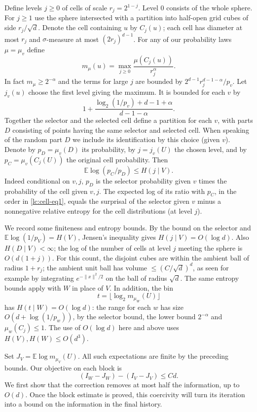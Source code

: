 Define levels \(j\ge 0\) of cells of scale \(r_j=2^{1-j}\). Level 0 consists of the whole sphere. For \(j\ge 1\) use the sphere intersected with a partition into half-open grid cubes of side \(r_j/\sqrt d\). Denote the cell containing \(u\) by \(C_j(u)\); each cell has diameter at most \(r_j\) and \(\sigma\)-measure at most \((2r_j)^{d-1}\). For any of our probability laws \(\mu=\mu_v\) define
\[
 m_\mu(u)=\max_{j\ge 0} \frac{\mu(C_j(u))}{r_j^\alpha}.
\]
In fact \(m_\mu\ge 2^{-\alpha}\) and the terms for large \(j\) are bounded by \(2^{d-1} r_j^{d-1-\alpha}/p_v\). Let \(j_v(u)\) choose the first level giving the maximum. It is bounded for each \(v\) by
\[
 1+\frac{\log_2(1/p_v)+d-1+\alpha}{d-1-\alpha}.
\]
Together the selector and the selected cell define a partition for each \(v\), with parts \(D\) consisting of points having the same selector and selected cell. When speaking of the random part \(D\) we include its identification by this choice (given \(v\)). Denote by \(p_D=\mu_v(D)\) its probability, by \(j=j_v(U)\) the chosen level, and by \(p_C=\mu_v(C_j(U))\) the original cell probability. Then
\begin{equation}\label{lc:cell-eq1}
\mathbb E\log(p_C/p_D)\le H(j\mid V).
\end{equation}
Indeed conditional on \(v,j\), \(p_D\) is the selector probability given \(v\) times the probability of the cell given \(v,j\). The expected log of its ratio with \(p_C\), in the order in \eqref{lc:cell-eq1}, equals the surprisal of the selector given \(v\) minus a nonnegative relative entropy for the cell distributions (at level \(j\)).

We record some finiteness and entropy bounds. By the bound on the selector and \(\mathbb E\log(1/p_V)=H(V)\), Jensen's inequality gives \(H(j\mid V)=O(\log d)\). Also \(H(D\mid V)<\infty\); the log of the number of cells at level \(j\) meeting the sphere is \(O(d(1+j))\). For this count, the disjoint cubes are within the ambient ball of radius \(1+r_j\); the ambient unit ball has volume \(\le (C/\sqrt d)^d\), as seen for example by integrating \(e^{-\|x\|^2/2}\) on the ball of radius \(\sqrt d\). The same entropy bounds apply with \(W\) in place of \(V\). In addition, the bin
\[
 t=\lfloor\log_2 m_{\mu_W}(U)\rfloor
\]
has \(H(t\mid W)=O(\log d)\): the range for each \(w\) has size \(O(d+\log(1/p_w))\), by the selector bound, the lower bound \(2^{-\alpha}\) and \(\mu_w(C_j)\le 1\). The use of \(O(\log d)\) here and above uses \(H(V),H(W)\le O(d^3)\).

Set \(J_V=\mathbb E\log m_{\mu_V}(U)\). All such expectations are
finite by the preceding bounds. Our objective on each block is
\[
 (I_W-J_W)-(I_V-J_V)\le Cd.
\]
We first show that the correction removes at most half the information,
up to \(O(d)\). Once the block estimate is proved, this coercivity
will turn its iteration into a bound on the information in the final
history.


